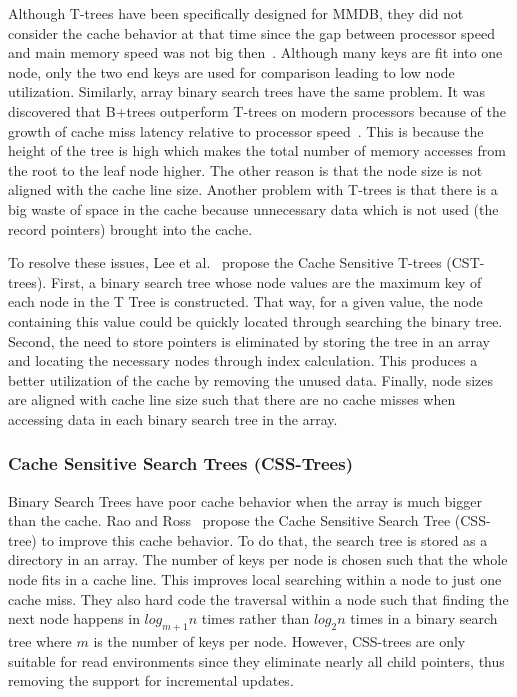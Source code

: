\documentclass[12pt,a4paper]{article}
\begin{document}
Although T-trees have been specifically designed for MMDB, they did not consider the cache behavior at that time since the gap between processor speed and main
memory speed was not big then~\cite{rao1999cache}. Although many keys are
fit into one node, only the two end keys are used for comparison leading to low node utilization. Similarly, array binary search trees have the same problem. 
It was discovered that B+trees outperform
T-trees on modern processors because of the growth of cache miss latency relative to processor speed~\cite{rao1999cache,lee2007cst}. This is because the height
of the tree is high which makes the total number of memory accesses from the root to the leaf node higher. The other reason is that the node size is not aligned
with the cache line size. Another problem with T-trees is that there is a big waste of space in the cache because unnecessary data which is not used (the
record pointers) brought into the cache.

To resolve these issues, Lee et al.~\cite{lee2007cst} propose the Cache Sensitive T-trees (CST-trees). First, a binary
search tree whose node values are the maximum key of each node in the T Tree is constructed. That way, for a given value, the node containing this value could
be quickly located through searching the binary tree. Second, the need to store pointers is eliminated by storing the tree in an array and locating the
necessary nodes through index calculation. This produces a better utilization of the cache by removing the unused data. Finally, node sizes are aligned with
cache line size such that there are no cache misses when accessing data in each
binary search tree in the array.

\subsubsection*{Cache Sensitive Search Trees (CSS-Trees)}

Binary Search Trees have poor cache behavior when the array is much bigger than the cache. Rao and Ross~\cite{rao1999cache} propose the Cache Sensitive Search
Tree (CSS-tree) to improve this cache behavior. To do that, the search tree is stored as a directory in an array. The number of keys per node is chosen such
that the whole node fits in a cache line. This improves local searching within a node to just one cache miss. They also hard code the traversal within a node
such that finding the next node happens in $log_{m+1}n$ times rather than $log_{2}n$ times in a binary search tree where $m$ is the number of keys per node.
However, CSS-trees are only suitable for read environments since they eliminate nearly all child pointers, thus removing the support for incremental updates.
\end{document}
